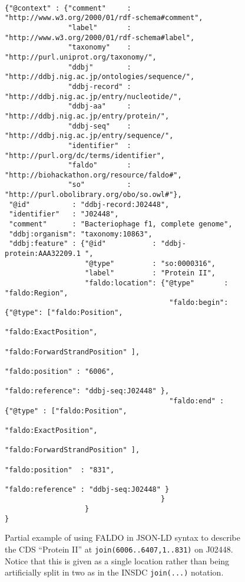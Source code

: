 \begin{figure}
\begin{shaded}
\small
\begin{verbatim}

{"@context" : {"comment"     : "http://www.w3.org/2000/01/rdf-schema#comment",
               "label"       : "http://www.w3.org/2000/01/rdf-schema#label",
               "taxonomy"    : "http://purl.uniprot.org/taxonomy/",
               "ddbj"        : "http://ddbj.nig.ac.jp/ontologies/sequence/",
               "ddbj-record" : "http://ddbj.nig.ac.jp/entry/nucleotide/",
               "ddbj-aa"     : "http://ddbj.nig.ac.jp/entry/protein/",
               "ddbj-seq"    : "http://ddbj.nig.ac.jp/entry/sequence/",
               "identifier"  : "http://purl.org/dc/terms/identifier",
               "faldo"       : "http://biohackathon.org/resource/faldo#",
               "so"          : "http://purl.obolibrary.org/obo/so.owl#"},
 "@id"          : "ddbj-record:J02448",
 "identifier"   : "J02448",
 "comment"      : "Bacteriophage f1, complete genome",
 "ddbj:organism": "taxonomy:10863",
 "ddbj:feature" : {"@id"           : "ddbj-protein:AAA32209.1 ",
                   "@type"         : "so:0000316",
                   "label"         : "Protein II",
                   "faldo:location": {"@type"       : "faldo:Region",
                                       "faldo:begin": {"@type": ["faldo:Position", 
                                                                 "faldo:ExactPosition",
                                                                 "faldo:ForwardStrandPosition" ],
                                                       "faldo:position" : "6006",
                                                       "faldo:reference": "ddbj-seq:J02448" },
                                       "faldo:end" : {"@type" : ["faldo:Position", 
                                                                 "faldo:ExactPosition",
                                                                 "faldo:ForwardStrandPosition" ],
                                                      "faldo:position"  : "831",
                                                      "faldo:reference" : "ddbj-seq:J02448" }
                                     }
                   }
}
\end{verbatim}
\end{shaded}
\caption{Partial example of using FALDO in JSON-LD\cite{JSONLDFormatSpec} syntax to describe
the CDS ``Protein II'' at \texttt{join(6006..6407,1..831)} on J02448. Notice that this is given as a
single location rather than being artificially split in two as in the INSDC \texttt{join(...)} notation.}
\label{fig:insdcReverseOverOrigin}
\end{figure}


